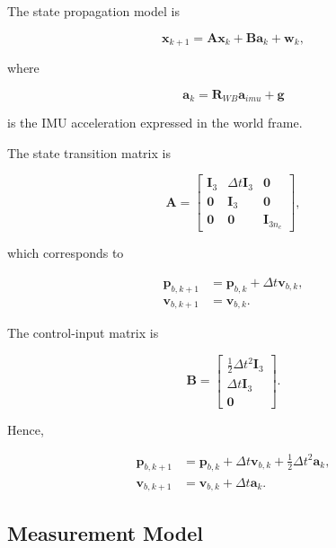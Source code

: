 The state propagation model is

\begin{equation}
\mathbf{x}_{k+1} = \mathbf{A}\mathbf{x}_k
+
\mathbf{B}\mathbf{a}_k
+
\mathbf{w}_{k},
\end{equation}

where

\begin{equation}
\mathbf{a}_k
= \mathbf{R}_{WB}\mathbf{a}_{imu}
+
\mathbf{g}
\end{equation}

is the IMU acceleration expressed in the world frame.

The state transition matrix is

\begin{equation}
\mathbf{A}=
\begin{bmatrix}
\mathbf{I}_3 & \Delta t \mathbf{I}_3 & \mathbf{0} \\
\mathbf{0} & \mathbf{I}_3 & \mathbf{0} \\
\mathbf{0} & \mathbf{0} & \mathbf{I}_{3n_c}
\end{bmatrix},
\end{equation}

which corresponds to

\begin{align}
\mathbf{p}_{b,k+1}
&=
\mathbf{p}_{b,k}
+
\Delta t \mathbf{v}_{b,k},
\\
\mathbf{v}_{b,k+1}
&=
\mathbf{v}_{b,k}.
\end{align}

The control-input matrix is

\begin{equation}
\mathbf{B}
=
\begin{bmatrix}
\frac{1}{2}\Delta t^2 \mathbf{I}_3 \\
\Delta t \mathbf{I}_3 \\
\mathbf{0}
\end{bmatrix}.
\end{equation}

Hence,

\begin{align}
\mathbf{p}_{b,k+1}
&=
\mathbf{p}_{b,k}
+
\Delta t \mathbf{v}_{b,k}
+
\frac{1}{2}\Delta t^2 \mathbf{a}_k,
\\
\mathbf{v}_{b,k+1}
&=
\mathbf{v}_{b,k}
+
\Delta t \mathbf{a}_k.
\end{align}

\subsection{Measurement Model}

